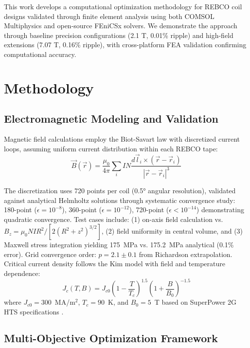 \documentclass[10pt,twocolumn]{article}
\begin{document}
This work develops a computational optimization methodology for REBCO coil designs validated through finite element analysis using both COMSOL Multiphysics and open-source FEniCSx solvers. We demonstrate the approach through baseline precision configurations (2.1 T, 0.01\% ripple) and high-field extensions (7.07 T, 0.16\% ripple), with cross-platform FEA validation confirming computational accuracy.

\section{Methodology}

\subsection{Electromagnetic Modeling and Validation}

Magnetic field calculations employ the Biot-Savart law with discretized current loops, assuming uniform current distribution within each REBCO tape:
\begin{equation}
\vec{B}(\vec{r}) = \frac{\mu_0}{4\pi} \sum_{i} I N \frac{d\vec{l}_i \times (\vec{r} - \vec{r}_i)}{|\vec{r} - \vec{r}_i|^3}
\end{equation}

The discretization uses 720 points per coil (0.5° angular resolution), validated against analytical Helmholtz solutions through systematic convergence study: 180-point ($\epsilon = 10^{-8}$), 360-point ($\epsilon = 10^{-12}$), 720-point ($\epsilon < 10^{-14}$) demonstrating quadratic convergence. Test cases include: (1) on-axis field calculation vs. $B_z = \mu_0 NI R^2 / [2(R^2 + z^2)^{3/2}]$, (2) field uniformity in central volume, and (3) Maxwell stress integration yielding 175~MPa vs. 175.2~MPa analytical (0.1\% error). Grid convergence order: $p = 2.1 \pm 0.1$ from Richardson extrapolation. Critical current density follows the Kim model with field and temperature dependence:
\begin{equation}
J_c(T,B) = J_{c0} \left(1-\frac{T}{T_c}\right)^{1.5} \left(1+\frac{B}{B_0}\right)^{-1.5}
\end{equation}
where $J_{c0}=300$~MA/m$^2$, $T_c=90$~K, and $B_0=5$~T based on SuperPower 2G HTS specifications \cite{superpower2022}.

\subsection{Multi-Objective Optimization Framework}
\end{document}
